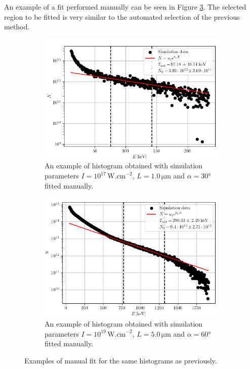 An example of a fit performed manually can be seen in Figure \ref{fig:manual-fit-example}. The selected region to be fitted is very similar to the automated selection of the previous method. 
\begin{figure}[ht]
	\centering
	\begin{subfigure}{0.49\textwidth}
		\centering
		\includegraphics[width=\textwidth]{figures/hist_1e17_100_30_manual}
		\caption{An example of histogram obtained with simulation parameters $I=10^{17}\,\mathrm{W.cm}^{-2}$, $L=1.0\,\mathrm{\mu m}$ and $\alpha = 30$° fitted manually.}
		\label{fig:manual-ex1-good}
	\end{subfigure}
	\hfill
	\begin{subfigure}{0.49\textwidth}
		\centering
		\includegraphics[width=\textwidth]{figures/hist_1e19_500_60_manual}
		\caption{An example of histogram obtained with simulation parameters $I=10^{19}\,\mathrm{W.cm}^{-2}$, $L=5.0\,\mathrm{\mu m}$ and $\alpha = 60$° fitted manually.}
		\label{fig:manual-ex2-good}
	\end{subfigure}
	\caption{Examples of manual fit for the same histograms as previously.}
	\label{fig:manual-fit-example}
\end{figure}


